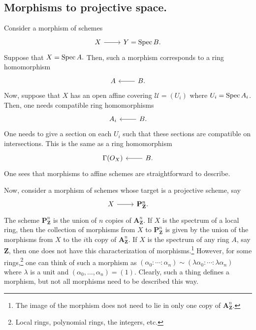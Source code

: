 \documentclass [11 pt, oneside] {article}
\begin{document}
\subsection{Morphisms to projective space.}
Consider a morphism of schemes
\[
\begin{tikzcd}
	X\ar[r]&Y=\Spec B.
\end{tikzcd}
\]
Suppose that $X=\operatorname{Spec} A.$ Then, such a morphism corresponds to a ring homomorphism
\[
\begin{tikzcd}
	A &B\ar[l].
\end{tikzcd}
\]
Now, suppose that $X$ has an open affine covering $\mathscr{U}=(U_i)$ where $U_i = \operatorname{Spec} A_i$. Then, one needs compatible ring homomorphisms
\[
\begin{tikzcd}
	A_i &B.\ar[l]
\end{tikzcd}
\]
One needs to give a section on each $U_i$ such that these sections are compatible on intersections. This is the same as a ring homomorphism
\[
\begin{tikzcd}
	\Gamma(\mathscr{O}_X) & B\ar[l].
\end{tikzcd}
\]
One sees that morphisms to affine schemes are straightforward to describe.

Now, consider a morphism of schemes whose target is a projective scheme, say
\[
\begin{tikzcd}
	X\ar[r]&\mathbf{P}^n_\mathbf{Z}.
\end{tikzcd}
\]
The scheme $\mathbf{P}^n_\mathbf{Z}$ is the union of $n$ copies of $\mathbf{A}^n_\mathbf{Z}$. If $X$ is the spectrum of a local ring, then the collection of morphisms from $X$ to $\mathbf{P}^n_\mathbf{Z}$ is given by the union of the morphisms from $X$ to the $i$th copy of $\mathbf{A}^n_\mathbf{Z}$.
If $X$ is the spectrum of any ring $A$, say $\mathbf{Z}$, then one does not have this characterization of morphisms.\footnote{The image of the morphism does not need to lie in only one copy of $\mathbf{A}^n_\mathbf{Z}$.} However, for some rings,\footnote{Local rings, polynomial rings, the integers, etc.} one can think of such a morphism as $(\alpha_0:\cdots:\alpha_n)\sim (\lambda \alpha_0:\cdots:\lambda \alpha_n)$ where $\lambda$ is a unit and $(\alpha_0,\hdots,\alpha_n)= (1)$.
Clearly, such a thing defines a morphism, but not all morphisms need to be described this way.
\end{document}
